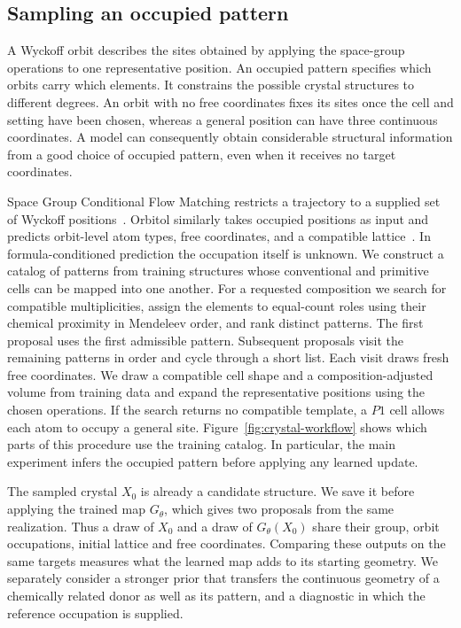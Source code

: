 \subsection{Sampling an occupied pattern}

A Wyckoff orbit describes the sites obtained by applying the space-group operations to one representative position. An occupied pattern specifies which orbits carry which elements. It constrains the possible crystal structures to different degrees. An orbit with no free coordinates fixes its sites once the cell and setting have been chosen, whereas a general position can have three continuous coordinates. A model can consequently obtain considerable structural information from a good choice of occupied pattern, even when it receives no target coordinates.

Space Group Conditional Flow Matching restricts a trajectory to a supplied set of Wyckoff positions~\cite{sgfm}. Orbitol similarly takes occupied positions as input and predicts orbit-level atom types, free coordinates, and a compatible lattice~\cite{orbitol}. In formula-conditioned prediction the occupation itself is unknown. We construct a catalog of patterns from training structures whose conventional and primitive cells can be mapped into one another. For a requested composition we search for compatible multiplicities, assign the elements to equal-count roles using their chemical proximity in Mendeleev order, and rank distinct patterns. The first proposal uses the first admissible pattern. Subsequent proposals visit the remaining patterns in order and cycle through a short list. Each visit draws fresh free coordinates. We draw a compatible cell shape and a composition-adjusted volume from training data and expand the representative positions using the chosen operations. If the search returns no compatible template, a $P1$ cell allows each atom to occupy a general site. Figure~\ref{fig:crystal-workflow} shows which parts of this procedure use the training catalog. In particular, the main experiment infers the occupied pattern before applying any learned update.

The sampled crystal $X_0$ is already a candidate structure. We save it before applying the trained map $G_\theta$, which gives two proposals from the same realization. Thus a draw of $X_0$ and a draw of $G_\theta(X_0)$ share their group, orbit occupations, initial lattice and free coordinates. Comparing these outputs on the same targets measures what the learned map adds to its starting geometry. We separately consider a stronger prior that transfers the continuous geometry of a chemically related donor as well as its pattern, and a diagnostic in which the reference occupation is supplied.

